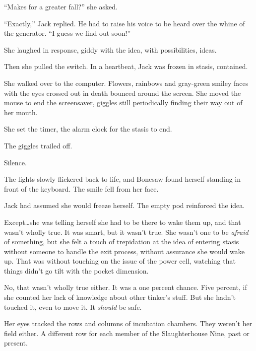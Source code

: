 ``Makes for a greater fall?'' she asked.



``Exactly,'' Jack replied.  He had to raise his voice to be heard over the whine of the generator.  ``I guess we find out soon!''



She laughed in response, giddy with the idea, with possibilities, ideas.



Then she pulled the switch.  In a heartbeat, Jack was frozen in stasis, contained.



She walked over to the computer.  Flowers, rainbows and gray-green smiley faces with the eyes crossed out in death bounced around the screen.  She moved the mouse to end the screensaver, giggles still periodically finding their way out of her mouth.



She set the timer, the alarm clock for the stasis to end.



The giggles trailed off.



Silence.



The lights slowly flickered back to life, and Bonesaw found herself standing in front of the keyboard.  The smile fell from her face.



Jack had assumed she would freeze herself.  The empty pod reinforced the idea.



Except\ldots she was telling herself she had to be there to wake them up, and that wasn't wholly true.  It was smart, but it wasn't true.  She wasn't one to be \emph{afraid} of something, but she felt a touch of trepidation at the idea of entering stasis without someone to handle the exit process, without assurance she would wake up.  That was without touching on the issue of the power cell, watching that things didn't go tilt with the pocket dimension.



No, that wasn't wholly true either.  It was a one percent chance.  Five percent, if she counted her lack of knowledge about other tinker's stuff.  But she hadn't touched it, even to move it.  It \emph{should} be safe.



Her eyes tracked the rows and columns of incubation chambers.  They weren't her field either.  A different row for each member of the Slaughterhouse Nine, past or present.



